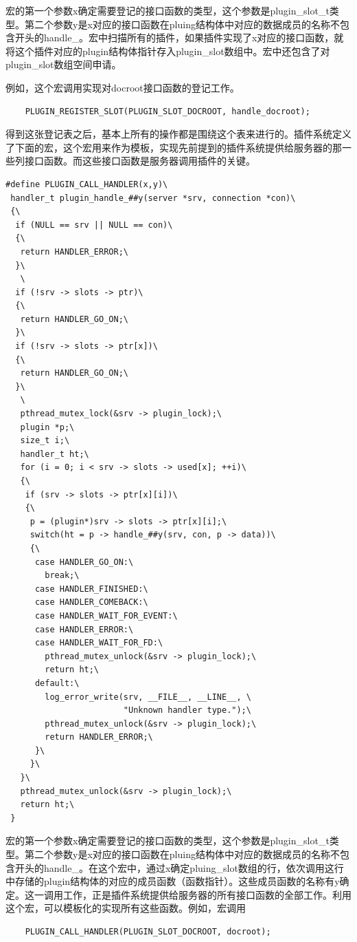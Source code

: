\documentclass[12pt, twoside, a4paper, xetex]{report}
\begin{document}
	宏的第一个参数x确定需要登记的接口函数的类型，这个参数是plugin\_slot\_t类型。第二个参数y是x对应的接口函数在pluing结构体中对应的数据成员的名称不包含开头的handle\_。宏中扫描所有的插件，如果插件实现了x对应的接口函数，就将这个插件对应的plugin结构体指针存入plugin\_slot数组中。宏中还包含了对plugin\_slot数组空间申请。
	
	例如，这个宏调用实现对docroot接口函数的登记工作。
	\begin{verbatim}
	PLUGIN_REGISTER_SLOT(PLUGIN_SLOT_DOCROOT, handle_docroot);
	\end{verbatim}
	
	得到这张登记表之后，基本上所有的操作都是围绕这个表来进行的。插件系统定义了下面的宏，这个宏用来作为模板，实现先前提到的插件系统提供给服务器的那一些列接口函数。而这些接口函数是服务器调用插件的关键。

\begin{verbatim}
#define PLUGIN_CALL_HANDLER(x,y)\
 handler_t plugin_handle_##y(server *srv, connection *con)\
 {\
  if (NULL == srv || NULL == con)\
  {\
   return HANDLER_ERROR;\
  }\
   \
  if (!srv -> slots -> ptr)\
  {\
   return HANDLER_GO_ON;\
  }\
  if (!srv -> slots -> ptr[x])\
  {\
   return HANDLER_GO_ON;\
  }\
   \
   pthread_mutex_lock(&srv -> plugin_lock);\
   plugin *p;\
   size_t i;\
   handler_t ht;\
   for (i = 0; i < srv -> slots -> used[x]; ++i)\
   {\
	if (srv -> slots -> ptr[x][i])\
	{\
	 p = (plugin*)srv -> slots -> ptr[x][i];\
	 switch(ht = p -> handle_##y(srv, con, p -> data))\
	 {\
	  case HANDLER_GO_ON:\
	    break;\
	  case HANDLER_FINISHED:\
	  case HANDLER_COMEBACK:\
	  case HANDLER_WAIT_FOR_EVENT:\
	  case HANDLER_ERROR:\
	  case HANDLER_WAIT_FOR_FD:\
		pthread_mutex_unlock(&srv -> plugin_lock);\
		return ht;\
	  default:\
		log_error_write(srv, __FILE__, __LINE__, \
						"Unknown handler type.");\
		pthread_mutex_unlock(&srv -> plugin_lock);\
		return HANDLER_ERROR;\
	  }\
     }\
   }\
   pthread_mutex_unlock(&srv -> plugin_lock);\
   return ht;\
 }
\end{verbatim}	
	
	宏的第一个参数x确定需要登记的接口函数的类型，这个参数是plugin\_slot\_t类型。第二个参数y是x对应的接口函数在pluing结构体中对应的数据成员的名称不包含开头的handle\_。在这个宏中，通过x确定pluing\_slot数组的行，依次调用这行中存储的plugin结构体的对应的成员函数（函数指针）。这些成员函数的名称有y确定。这一调用工作，正是插件系统提供给服务器的所有接口函数的全部工作。利用这个宏，可以模板化的实现所有这些函数。例如，宏调用
	
	\begin{verbatim}
	PLUGIN_CALL_HANDLER(PLUGIN_SLOT_DOCROOT, docroot);
	\end{verbatim}
	
\end{document}
